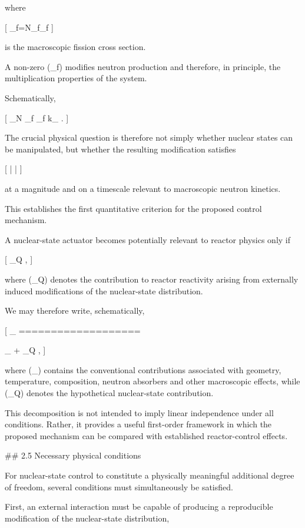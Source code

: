 where

[
\Sigma_f=N_f\sigma_f
]

is the macroscopic fission cross section.

A non-zero (\delta \Sigma_f) modifies neutron production and therefore, in principle, the multiplication properties of the system.

Schematically,

[
\delta\rho_N
\rightarrow
\delta\sigma_f
\rightarrow
\delta\Sigma_f
\rightarrow
\delta k_{}
\rightarrow
\delta\rho .
]

The crucial physical question is therefore not simply whether nuclear states can be manipulated, but whether the resulting modification satisfies

[
\left|
\right|
]

at a magnitude and on a timescale relevant to macroscopic neutron kinetics.

This establishes the first quantitative criterion for the proposed control mechanism.

A nuclear-state actuator becomes potentially relevant to reactor physics only if

[
\delta \rho_Q
,
]

where (\delta \rho_Q) denotes the contribution to reactor reactivity arising from externally induced modifications of the nuclear-state distribution.

We may therefore write, schematically,

[
\rho_{}
===================

\rho_{}
+
\rho_Q ,
]

where (\rho_{}) contains the conventional contributions associated with geometry, temperature, composition, neutron absorbers and other macroscopic effects, while (\rho_Q) denotes the hypothetical nuclear-state contribution.

This decomposition is not intended to imply linear independence under all conditions. Rather, it provides a useful first-order framework in which the proposed mechanism can be compared with established reactor-control effects.

## 2.5 Necessary physical conditions

For nuclear-state control to constitute a physically meaningful additional degree of freedom, several conditions must simultaneously be satisfied.

First, an external interaction must be capable of producing a reproducible modification of the nuclear-state distribution,

